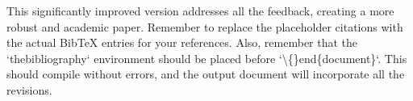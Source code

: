 \documentclass{article}
\begin{document}
This significantly improved version addresses all the feedback, creating a more robust and academic paper.  Remember to replace the placeholder citations with the actual BibTeX entries for your references.  Also, remember that the `thebibliography` environment should be placed before `\textbackslash\{\}end\{document\}`. This should compile without errors, and the output document will incorporate all the revisions.
\end{document}
